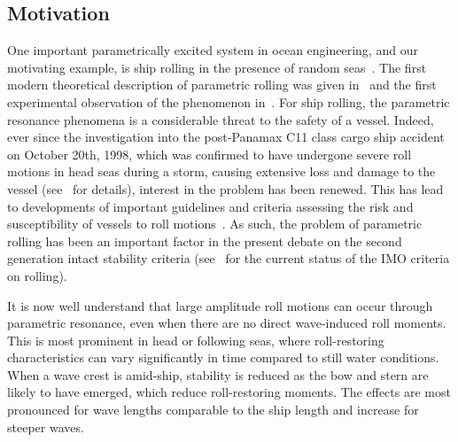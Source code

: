 \documentclass[3p]{elsarticle}
\begin{document}
\subsection{Motivation}\label{sec:motivation}
One important parametrically excited system in ocean engineering, and our motivating example, is ship rolling in the presence of random seas~\cite{belenky07, Chai2015, Lin1995, Kougioumtzoglou2014, Kreuzer,arnold_l,mit.00201659320120101}. The first modern theoretical description of parametric rolling was given in~\cite{Paulling59}  and    the first experimental observation of the phenomenon in~\cite{paulling1975ship}. For  ship rolling, the parametric resonance phenomena is a considerable threat to the safety of a vessel.  Indeed, ever since the investigation into the  post-Panamax C11 class cargo ship accident on October 20th, 1998, which was confirmed to have undergone severe roll motions in head seas during a storm, causing extensive loss and damage to the vessel (see~\cite{000180174200001n.d.} for details), interest in the problem has been renewed. This has lead  to developments of important guidelines and   criteria    assessing  the risk and susceptibility of vessels to roll motions~\cite{ABS2004}. As such, the problem of  parametric rolling has been an important factor in the present debate on the second generation intact stability criteria (see~\cite{Francescutto15} for the current status of the IMO criteria on rolling).

It is  now well understand that  large amplitude roll motions can occur through parametric  resonance,  even when there are no direct wave-induced roll  moments. This is most prominent in head or following seas, where roll-restoring characteristics can vary   significantly in time  compared to still water conditions. When a wave crest is amid-ship, stability is reduced as the   bow and stern are likely to have emerged, which reduce   roll-restoring moments. The effects are most pronounced for wave lengths comparable  to the ship length and increase for steeper waves. 
\end{document}
